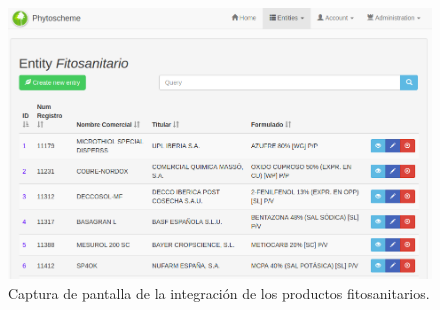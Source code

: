 \begin{figure}[!h]
    \centering
    \includegraphics[width=\textwidth,height=\textheight,keepaspectratio]{Imagenes/capturaFitosanitarios}
    \caption{Captura de pantalla de la integración de los productos fitosanitarios.}
    \label{fig:capturaFitosanitarios}
\end{figure}

